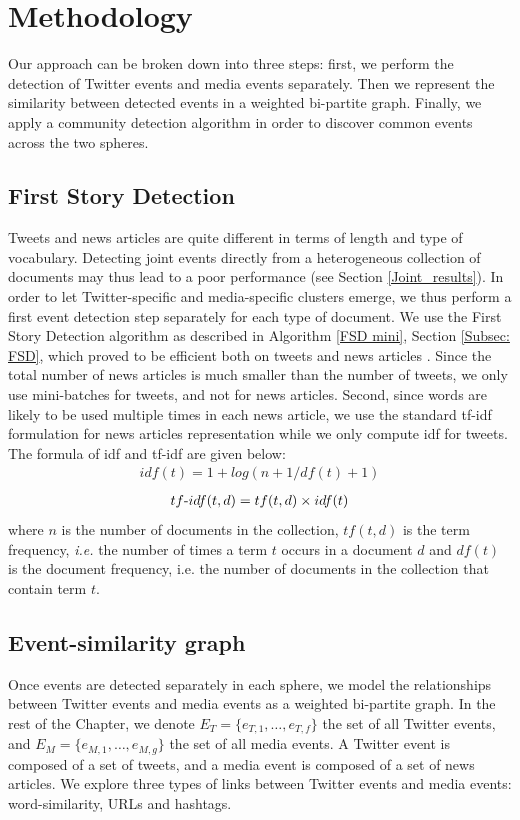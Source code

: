 \section{Methodology}
\label{JointEventsMethodo}
Our approach can be broken down into three steps: first, we perform the detection of Twitter events and media events separately. Then we represent the similarity between detected events in a weighted bi-partite graph. Finally, we apply a community detection algorithm in order to discover common events across the two spheres.

\subsection{First Story Detection}
Tweets and news articles are quite different in terms of length and type of vocabulary. Detecting joint events directly from a heterogeneous collection of documents may thus lead to a poor performance (see Section \ref{Joint_results}). In order to let Twitter-specific and media-specific clusters emerge, we thus perform a first event detection step separately for each type of document. We use the First Story Detection algorithm as described in Algorithm \ref{FSD mini}, Section \ref{Subsec: FSD}, which proved to be efficient both on tweets \citep{mazoyer2020french} and news articles \citep{cage2020production}. Since the total number of news articles is much smaller than the number of tweets, we only use mini-batches for tweets, and not for news articles. Second, since words are likely to be used multiple times in each news article, we use the standard tf-idf formulation for news articles representation while we only compute idf for tweets. The formula of idf and tf-idf are given below:
\begin{align}
idf(t) = 1 + log(n+1/df(t)+1)
\end{align}
\begin{align}
tf{\text -}idf(t, d) = tf(t, d) \times idf(t)
\end{align}
where $n$ is the number of documents in the collection, $tf(t, d)$ is the term frequency, \textit{i.e.} the number of times a term $t$ occurs in a document $d$ and $df(t)$ is the document frequency, i.e. the number of documents in the collection that contain term $t$.

\subsection{Event-similarity graph}
Once events are detected separately in each sphere, we model the relationships between Twitter events and media events as a weighted bi-partite graph. In the rest of the Chapter, we denote $E_T = \{e_{T,1},\ldots,e_{T,f}\}$ the set of all Twitter events, and $E_M = \{e_{M,1},\ldots,e_{M,g}\}$ the set of all media events. A Twitter event is composed of a set of tweets, and a media event is composed of a set of news articles. We explore three types of links between Twitter events and media events: word-similarity, URLs and hashtags. 
